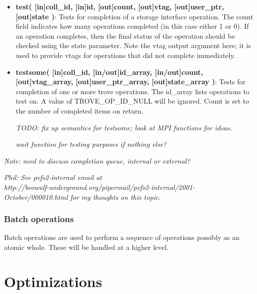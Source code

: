 \documentclass[10pt]{article} %
\begin{document}
\begin{itemize}
\item \textbf{test(
[in]coll\_id,
[in]id,
[out]count,
[out]vtag,
[out]user\_ptr,
[out]state
)}:
Tests for completion of a storage interface operation.  The count field
indicates how many operations completed (in this case either 1 or 0).
If an operation completes, then the final status of the operation should
be checked using the state parameter.  Note the vtag output argument
here; it is used to provide vtags for operations that did not complete
immediately.

\item \textbf{testsome(
[in]coll\_id,
[in/out]id\_array,
[in/out]count,
[out]vtag\_array,
[out]user\_ptr\_array,
[out]state\_array
)}:
Tests for completion of one or more trove operations.  The id\_array lists
operations to test on.  A value of TROVE\_OP\_ID\_NULL will be ignored.  Count is
set to the number of completed items on return.

\emph{TODO: fix up semantics for testsome; look at MPI functions for ideas.}

\emph{wait function for testing purposes if nothing else?}

\end{itemize}

\emph{Note: need to discuss completion queue, internal or external?}

\emph{Phil: See pvfs2-internal email at \\
http://beowulf-underground.org/pipermail/pvfs2-internal/2001-October/000010.html
for my thoughts on this topic.}

\subsubsection{Batch operations}

Batch operations are used to perform a sequence of operations possibly as an
atomic whole.  These will be handled at a higher level.

\section{Optimizations}
\end{document}
